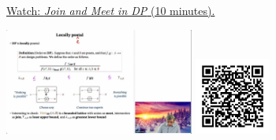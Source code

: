 
\begin{minipage}{10cm}
    \href{https://act4e-spring21.netlify.app/videos/spring2021-functorial-comp-b:solving-queries:or-and-and.html}{Watch: \emph{Join and Meet in DP} (10 minutes).}
        
    \href{https://act4e-spring21.netlify.app/videos/spring2021-functorial-comp-b:solving-queries:or-and-and.html}{\includegraphics[height=3.5cm]{spring2021-functorial-comp-b:solving-queries:or-and-and/thumbnails.jpg}}
    \href{https://act4e-spring21.netlify.app/videos/spring2021-functorial-comp-b:solving-queries:or-and-and.html}{\includegraphics[height=2.5cm]{spring2021-functorial-comp-b:solving-queries:or-and-and/qrcode.png}}
\end{minipage}
